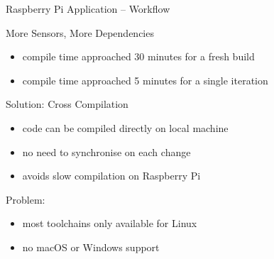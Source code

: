 \documentclass[aspectratio=1610]{beamer}
\newcommand\green[1]{{\color{green(ncs)}#1}}
\newcommand\red[1]{{\color{amaranth}#1}}
\begin{document}
  \begin{frame}{Raspberry Pi Application -- Workflow}
    \begin{block}{More Sensors, More Dependencies}
      \begin{itemize}
        \item compile time approached 30 minutes for a fresh build
        \item compile time approached 5 minutes for a single iteration
      \end{itemize}
    \end{block}

     {
    \begin{block}{\green{Solution:} Cross Compilation}
      \begin{itemize}
        \item code can be compiled directly on local machine
        \item no need to synchronise on each change
        \item avoids slow compilation on Raspberry Pi
      \end{itemize}
    \end{block}
    }

     {
    \begin{block}{\red{Problem:}}
      \begin{itemize}
        \item most toolchains only available for Linux
        \item no macOS or Windows support
      \end{itemize}
    \end{block}
    }
  \end{frame}
\end{document}

